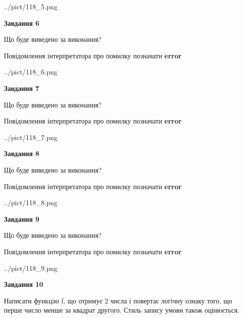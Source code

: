 \documentclass[12pt, ukrainian]{article}
\begin{document}
{\begin {large}
\begin{center}
	{../pict/118_5.png}
\end{center}
\newpage

{\begin {center}\textbf{Завдання 6}\end {center}}\par
Що буде виведено за виконання? \par
Повідомлення інтерпретатора про помилку позначати \textbf{error}

\begin{center}
	{../pict/118_6.png}
\end{center}
\newpage

{\begin {center}\textbf{Завдання 7}\end {center}}\par
Що буде виведено за виконання? \par
Повідомлення інтерпретатора про помилку позначати \textbf{error}

\begin{center}
	{../pict/118_7.png}
\end{center}
\newpage

{\begin {center}\textbf{Завдання 8}\end {center}}\par
Що буде виведено за виконання? \par
Повідомлення інтерпретатора про помилку позначати \textbf{error}

\begin{center}
	{../pict/118_8.png}
\end{center}
\newpage

{\begin {center}\textbf{Завдання 9}\end {center}}\par
Що буде виведено за виконання? \par
Повідомлення інтерпретатора про помилку позначати \textbf{error}

\begin{center}
	{../pict/118_9.png}
\end{center}
\newpage

{\begin {center}\textbf{Завдання 10}\end {center}}\par

Написати функцiю f, що отримує 2 числа і повертає логічну ознаку того, що перше число менше за квадрат другого. Стиль запису умови також оцінюється.\par
\newpage

\end {large}}
\end{document}

